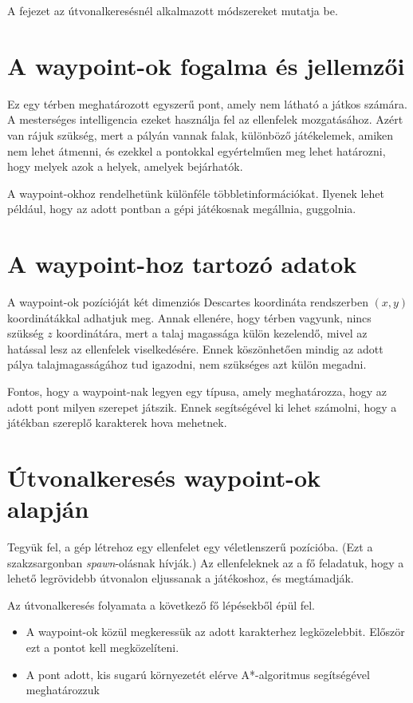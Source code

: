 \label{Chap:utvonalkereses}

A fejezet az útvonalkeresésnél alkalmazott módszereket mutatja be.

\section{A waypoint-ok fogalma és jellemzői}

Ez egy térben meghatározott egyszerű pont, amely nem látható a játkos számára. A mesterséges intelligencia ezeket használja fel az ellenfelek mozgatásához. Azért van rájuk szükség, mert a pályán vannak falak, különböző játékelemek, amiken nem lehet átmenni, és ezekkel a pontokkal egyértelműen meg lehet határozni, hogy melyek azok a helyek, amelyek bejárhatók.

A waypoint-okhoz rendelhetünk különféle többletinformációkat. Ilyenek lehet például, hogy az adott pontban a gépi játékosnak megállnia, guggolnia.

\section{A waypoint-hoz tartozó adatok}

A waypoint-ok pozícióját két dimenziós Descartes koordináta rendszerben $(x, y)$ koordinátákkal adhatjuk meg. Annak ellenére, hogy térben vagyunk, nincs szükség $z$ koordinátára, mert a talaj magassága külön kezelendő, mivel az hatással lesz az ellenfelek viselkedésére. Ennek köszönhetően mindig az adott pálya talajmagasságához tud igazodni, nem szükséges azt külön megadni.

Fontos, hogy a waypoint-nak legyen egy típusa, amely meghatározza, hogy az adott pont milyen szerepet játszik. Ennek segítségével ki lehet számolni, hogy a játékban szereplő karakterek hova mehetnek.

\section{Útvonalkeresés waypoint-ok alapján}


Tegyük fel, a gép létrehoz egy ellenfelet egy véletlenszerű pozícióba. (Ezt a szakzsargonban \textit{spawn}-olásnak hívják.) Az ellenfeleknek az a fő feladatuk, hogy a lehető legrövidebb útvonalon eljussanak a játékoshoz, és megtámadják. 

Az útvonalkeresés folyamata a következő fő lépésekből épül fel.
\begin{itemize}
\item A waypoint-ok közül megkeressük az adott karakterhez legközelebbit. Először ezt a pontot kell megközelíteni.
\item A pont adott, kis sugarú környezetét elérve A*-algoritmus segítségével meghatározzuk
\end{itemize}

